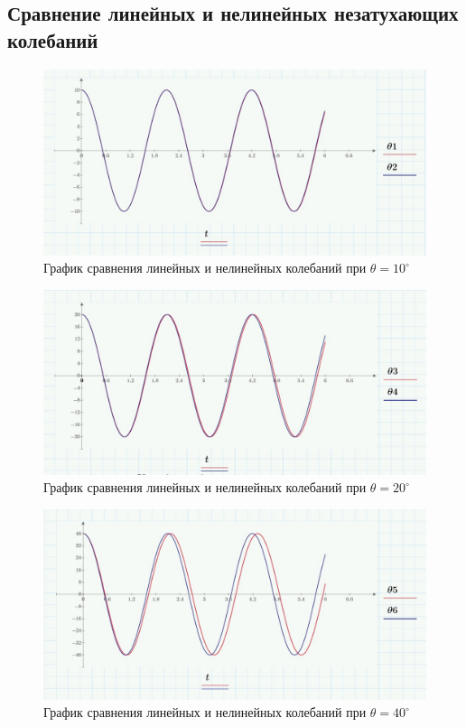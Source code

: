 \documentclass[a4paper, 14pt]{extarticle}
\begin{document}
		\subsection{Сравнение линейных и нелинейных незатухающих колебаний}		
		\begin{figure}[H]
			\centering
			\includegraphics[width = \linewidth]{2.jpg}
			\caption[.] {График сравнения линейных и нелинейных колебаний при $\theta = 10^{\circ}$}
		\end{figure}
		\begin{figure}[H]
			\centering
			\includegraphics[width = \linewidth]{4.jpg}
			\caption[.] {График сравнения линейных и нелинейных колебаний при $\theta = 20^{\circ}$}
		\end{figure}
		\begin{figure}[H]
			\centering
			\includegraphics[width = \linewidth]{6.jpg}
			\caption[.] {График сравнения линейных и нелинейных колебаний при $\theta = 40^{\circ}$}
		\end{figure}
\end{document}
